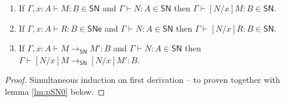 \documentclass{article}
\newcommand{\SN}{\mathsf{SN}}
\newcommand{\SNe}{\mathsf{SNe}}
\newcommand{\redSN}{\longrightarrow_\SN}
\begin{document}
\begin{lemma}\label{lem:SNsubst}\quad
  \begin{enumerate}
  \item If $\Gamma, x{:}A \vdash M : B \in \SN$ and $\Gamma \vdash N : A \in \SN$
    then $\Gamma \vdash [N/x]M : B \in \SN$.
  \item If $\Gamma, x{:}A \vdash R : B \in \SNe$ and $\Gamma \vdash N : A \in \SN$
    then $\Gamma \vdash [N/x]R : B \in \SN$.
  \item If $\Gamma, x{:}A \vdash M \redSN M' : B$ and $\Gamma \vdash N : A \in \SN$ then
    $\Gamma \vdash [N/x]M \redSN [N/x]M' : B$.
  \end{enumerate}
\end{lemma}
\begin{proof}
Simultaneous induction on first derivation -- to proven together with lemma \ref{lm:pSN0} below.





\end{proof}
\end{document}
